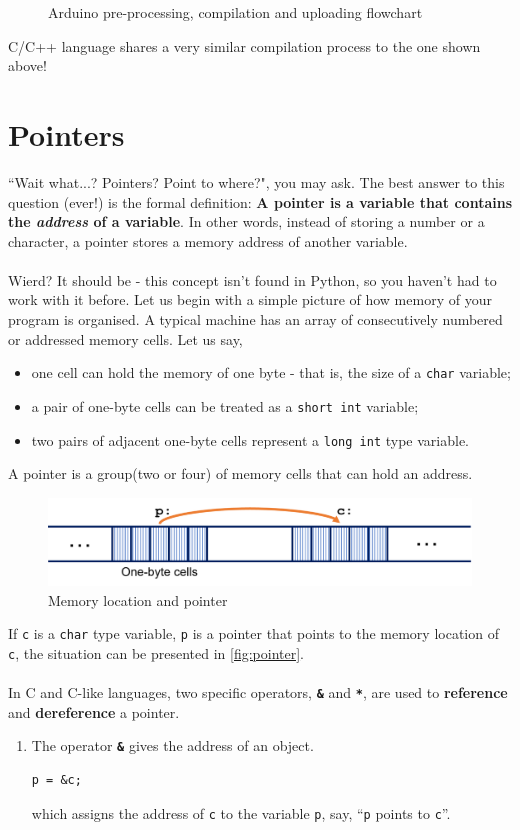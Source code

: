 \documentclass{article}
\begin{document}
\begin{appendices}
\begin{figure}[H]
    \caption{Arduino pre-processing, compilation and uploading flowchart}
\end{figure}
\noindent C/C++ language shares a very similar compilation process to the one shown above!

\newpage 
\section{Pointers}
``Wait what...?  Pointers? Point to where?", you may ask. The best answer to this question (ever!) is the formal definition: \textbf{A pointer is a variable that contains the \textit{address} of a variable}. In other words, instead of storing a number or a character, a pointer stores a memory address of another variable. \\\\
Wierd? It should be - this concept isn't found in Python, so you haven't had to work with it before. Let us begin with a simple picture of how memory of your program is organised. A typical machine has an array of consecutively numbered or addressed memory cells. Let us say, 
\begin{itemize}
    \item one cell can hold the memory of one byte - that is, the size of a \texttt{char} variable;
    \item a pair of one-byte cells can be treated as a \texttt{short int} variable;
    \item two pairs of adjacent one-byte cells represent a \texttt{long int} type variable. 
\end{itemize}
A pointer is a group(two or four) of memory cells that can hold an address.
\begin{figure}[H]
    \centering
    \includegraphics[width=.6\textwidth]{pointer.png}
    \caption{Memory location and pointer}
    \label{fig:pointer}
\end{figure}
\noindent If \texttt{c} is a \texttt{char} type variable, \texttt{p} is a pointer that points to the memory location of \texttt{c}, the situation can be presented in \autoref{fig:pointer}.\\\\
In C and C-like languages, two specific operators, {\Large\textbf{\texttt{\&}}} and {\Large\textbf{\texttt{*}}}, are used to \textbf{reference} and \textbf{dereference} a pointer. 
\begin{enumerate}
    \item The operator {\Large\textbf{\texttt{\&}}} gives the address of an object. 
\begin{lstlisting} 
p = &c;
\end{lstlisting}
    \vspace{-.7cm} which assigns the address of \texttt{c} to the variable \texttt{p}, say, ``\texttt{p} points to \texttt{c}''.
    

\end{enumerate}
\end{appendices}
\end{document}
